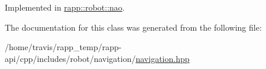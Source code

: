 Implemented in \hyperlink{classrapp_1_1robot_1_1nao_a8810ac769c75fa2f4723770c9e58a17e}{rapp\-::robot\-::nao}.



The documentation for this class was generated from the following file\-:\begin{DoxyCompactItemize}
\item 
/home/travis/rapp\-\_\-temp/rapp-\/api/cpp/includes/robot/navigation/\hyperlink{navigation_8hpp}{navigation.\-hpp}\end{DoxyCompactItemize}
